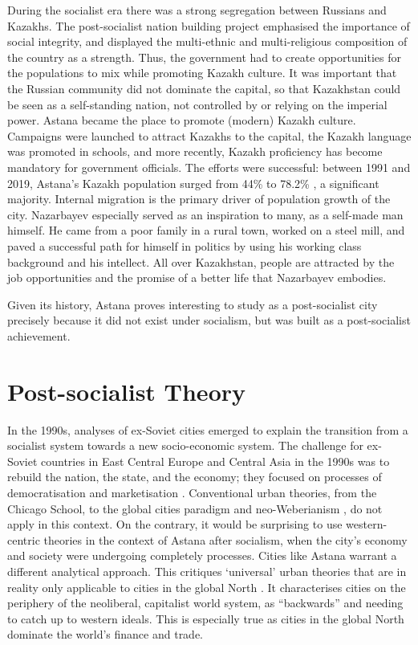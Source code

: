 \documentclass{article}
\begin{document}
During the socialist era there was a strong segregation between Russians and Kazakhs. The post-socialist nation building project emphasised the importance of social integrity, and displayed the multi-ethnic and multi-religious composition of the country as a strength. Thus, the government had to create opportunities for the populations to mix while promoting Kazakh culture. It was important that the Russian community did not dominate the capital, so that Kazakhstan could be seen as a self-standing nation, not controlled by or relying on the imperial power. 
Astana became the place to promote (modern) Kazakh culture. Campaigns were launched to attract Kazakhs to the capital, the Kazakh language was promoted in schools, and more recently, Kazakh proficiency has become mandatory for government officials. The efforts were successful: between 1991 and 2019, Astana's Kazakh population surged from 44\% to 78.2\% \parencite{unfpa2020wekazakhstan}, a significant majority. 
Internal migration is the primary driver of population growth of the city. Nazarbayev especially served as an inspiration to many, as a self-made man himself. He came from a poor family in a rural town, worked on a steel mill, and paved a successful path for himself in politics by using his working class background and his intellect. All over Kazakhstan, people are attracted by the job opportunities and the promise of a better life that Nazarbayev embodies.

Given its history, Astana proves interesting to study as a post-socialist city precisely because it did not exist under socialism, but was built as a post-socialist achievement.

\section{Post-socialist Theory}

In the 1990s, analyses of ex-Soviet cities emerged to explain the transition from a socialist system towards a new socio-economic system. The challenge for ex-Soviet countries in East Central Europe and Central Asia in the 1990s was to rebuild the nation, the state, and the economy; they focused on processes of democratisation and marketisation \parencite{ferenvcuhova2016introduction}. Conventional urban theories, from the Chicago School, to the global cities paradigm and neo-Weberianism \parencite{haussermann2005european}, do not apply in this context.
On the contrary, it would be surprising to use western-centric theories in the context of Astana after socialism, when the city's economy and society were undergoing completely processes. Cities like Astana warrant a different analytical approach. This critiques `universal' urban theories that are in reality only applicable to cities in the global North \parencite{ferenvcuhova2016accounts} \parencite{robinson2013ordinary}. It characterises cities on the periphery of the neoliberal, capitalist world system, as ``backwards'' and needing to catch up to western ideals. This is especially true as cities in the global North dominate the world's finance and trade.
\end{document}
